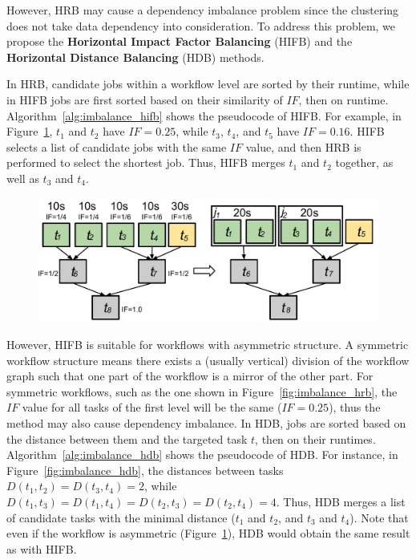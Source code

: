 


However, HRB may cause a dependency imbalance problem since the clustering does not take data dependency into consideration. To address this problem, we propose the \textbf{Horizontal Impact Factor Balancing} (HIFB) and the \textbf{Horizontal Distance Balancing} (HDB) methods. 

In HRB, candidate jobs within a workflow level are sorted by their runtime, while in HIFB jobs are first sorted based on their similarity of $IF$, then on runtime. 
Algorithm~\ref{alg:imbalance_hifb} shows the pseudocode of HIFB. 
For example, in Figure~\ref{fig:imbalance_hifb}, $t_1$ and $t_2$ have $IF = 0.25$, while $t_3$, $t_4$, and $t_5$ have $IF = 0.16$. HIFB selects a list of candidate jobs with the same $IF$ value, and then HRB is performed to select the shortest job. Thus, HIFB merges $t_1$ and $t_2$ together, as well as $t_3$ and $t_4$.

\begin{figure}[htb]
	\centering
	\includegraphics[width=0.75\linewidth]{figures/balance/figure9.pdf}
	\label{fig:imbalance_hifb}
\end{figure}

However, HIFB is suitable for workflows with asymmetric structure. A symmetric workflow structure means there exists a (usually vertical) division of the workflow graph such that one part of the workflow is a mirror of the other part. For symmetric workflows, such as the one shown in Figure~\ref{fig:imbalance_hrb}, the $IF$ value for all tasks of the first level will be the same ($IF=0.25$), thus the method may also cause dependency imbalance. In HDB, jobs are sorted based on the distance between them and the targeted task $t$, then on their runtimes. 
Algorithm~\ref{alg:imbalance_hdb} shows the pseudocode of HDB. 
For instance, in Figure~\ref{fig:imbalance_hdb}, the distances between tasks $D(t_1,t_2)=D(t_3,t_4)=2$, while $D(t_1,t_3)=D(t_1,t_4)=D(t_2,t_3)=D(t_2,t_4)=4$. Thus, HDB merges a list of candidate tasks with the minimal distance ($t_1$ and $t_2$, and $t_3$ and $t_4$). Note that even if the workflow is asymmetric (Figure~\ref{fig:imbalance_hifb}), HDB would obtain the same result as with HIFB. 

